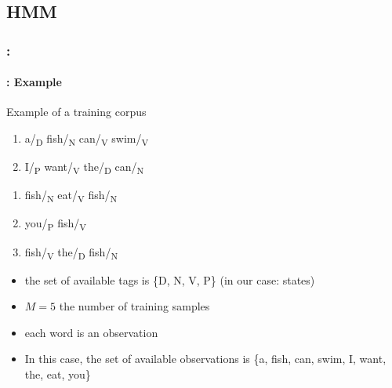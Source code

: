 \documentclass[xcolor=table]{beamer}
\begin{document}
\subsection{HMM}

\begin{frame}
	\frametitle{\insertshortsubtitle: \insertsection}
	\framesubtitle{\insertsubsection: Example}
	
	\begin{exampleblock}{Example of a training corpus}
		\hspace{12pt}
		\begin{minipage}{0.38\textwidth}
			\begin{enumerate}
				\item a/\textsubscript{D} fish/\textsubscript{N} can/\textsubscript{V} swim/\textsubscript{V}
				\item I/\textsubscript{P} want/\textsubscript{V} the/\textsubscript{D} can/\textsubscript{N}
			\end{enumerate}
		\end{minipage}
		\begin{minipage}{0.15\textwidth}
			\hfill
		\end{minipage}
		\begin{minipage}{0.38\textwidth}
			\begin{enumerate}\addtocounter{enumi}{2}
				\item fish/\textsubscript{N} eat/\textsubscript{V} fish/\textsubscript{N}
				\item you/\textsubscript{P} fish/\textsubscript{V} 
				\item fish/\textsubscript{V} the/\textsubscript{D} fish/\textsubscript{N}
			\end{enumerate}
		\end{minipage}
	\end{exampleblock}

	\begin{itemize}
		\item the set of available tags is \{D, N, V, P\} (in our case: states)
		\item $ M = 5 $ the number of training samples
		\item each word is an observation
		\item In this case, the set of available observations is \{a, fish, can, swim, I, want, the, eat, you\}
	\end{itemize}
	
\end{frame}
\end{document}
